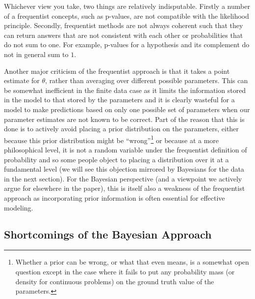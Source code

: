Whichever view you take, two things are relatively indisputable.  Firstly a number of a frequentist concepts, such as p-values,
are not compatible with the likelihood principle.  Secondly, frequentist methods are not always coherent such that they can
return answers that are not consistent with each other or probabilities that do not sum to one.  For example, p-values
for a hypothesis and its complement do not in general sum to $1$.  

Another major criticism of the frequentist approach is that it takes a point estimate for $\theta$, rather than averaging
over different possible parameters.  This can be somewhat inefficient in the finite data case as it limits the information
stored in the model to that stored by the parameters and it is clearly wasteful for a model to make predictions based on
only one possible set of parameters when our parameter estimates are not known to be correct.  Part of the reason that this
is done is to actively avoid placing a prior distribution on the parameters, either because this prior distribution might
be ``wrong''\footnote{Whether a prior can be wrong, or what that even means, is a somewhat open question except in the
	case where it fails to put any probability mass (or density for continuous problems) on the ground truth value of
	the parameters.} or because at a more philosophical level, it is not a random variable under the frequentist definition
of probability and so some people object to placing a distribution over it at a fundamental level (we will see this objection
mirrored by Bayesians for the data in the next section).  For the Bayesian perspective (and a viewpoint we actively 
argue for elsewhere in the paper), this is itself also a weakness of the frequentist approach as incorporating prior
information is often essential for effective modeling.


\subsection{Shortcomings of the Bayesian Approach}
\label{sec:bayes:religion:bayes}

